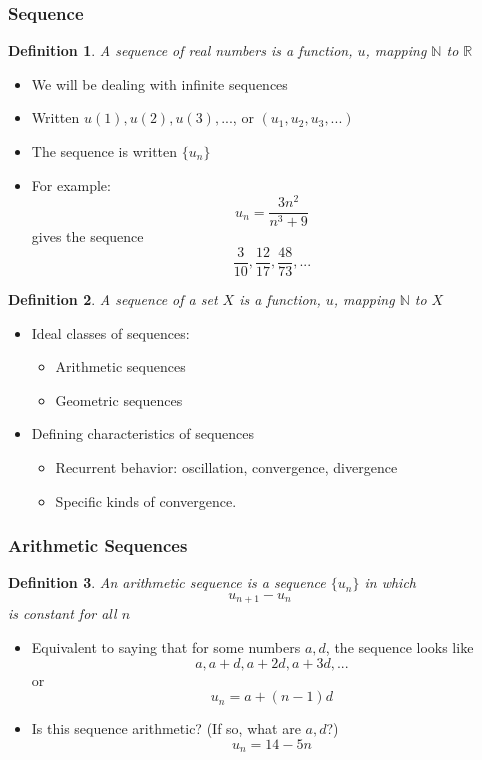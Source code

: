 \documentclass[handout]{beamer}
\newtheorem{defn}{Definition}
\numberwithin{equation}{section}
\begin{document}
\begin{frame}
\frametitle{Sequence}

\begin{defn}
A \alert{sequence} of real numbers is a function, $u$, mapping $\mathbb{N}$ to $\mathbb{R}$
\end{defn} \pause

\begin{itemize}
\item We will be dealing with infinite sequences \pause
\item Written $u(1), u(2), u(3), ... $, or $(u_1, u_2, u_3, ...)$ \pause
\item The sequence is written $\{u_n\}$ \pause
\item For example: $$u_{n} = \frac{3n^2}{n^3+9}$$ gives the sequence $$\frac{3}{10}, \frac{12}{17}, \frac{48}{73}, ...$$
\end{itemize}
\begin{defn}
A \alert{sequence} of a set $X$ is a function, $u$, mapping $\mathbb{N}$ to $X$
\end{defn} \pause
\end{frame}


\begin{frame}
\begin{itemize}
\item Ideal classes of sequences:
\begin{itemize}
\item Arithmetic sequences
\item Geometric sequences
\end{itemize}
\item Defining characteristics of sequences
\begin{itemize}
\item Recurrent behavior: oscillation, convergence, divergence
\item Specific kinds of convergence.
\end{itemize}
\end{itemize}

\end{frame}




\begin{frame}
\frametitle{Arithmetic Sequences}

\begin{defn}
An arithmetic sequence is a sequence $\{u_n\}$ in which $$u_{n+1} - u_{n}$$ is constant for all $n$
\end{defn} \pause

\begin{itemize}
\item Equivalent to saying that for some numbers $a, d$, the sequence looks like $$a, a+d, a+2d, a+3d, ...$$ or $$u_n=a+(n-1)d$$ \pause
\item Is this sequence arithmetic? (If so, what are $a, d$?) $$u_{n} = 14 - 5n$$
\end{itemize}

\end{frame}
\end{document}
